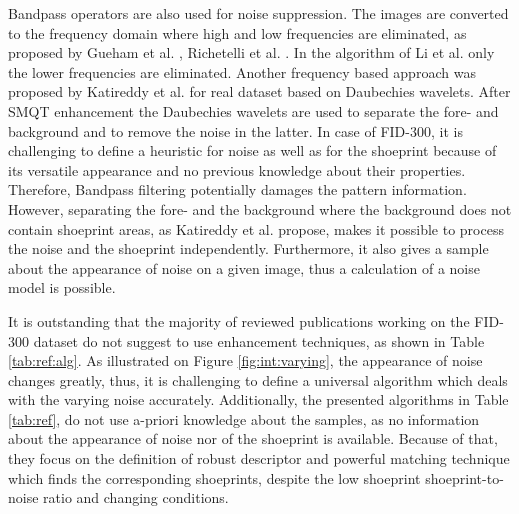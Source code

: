 \documentclass[draft,final]{vutinfth} %
\begin{document}
\par
Bandpass operators are also used for noise suppression.
The images are converted to the frequency domain where high and low frequencies are eliminated, as proposed by Gueham et al. \cite{gueham2007automatic},  Richetelli et al. \cite{richetelli2017classification}.
In the algorithm of Li et al. \cite{li2014retrieval} only the lower frequencies are eliminated.
Another frequency based approach was proposed by Katireddy et al. \cite{katireddy2017novel} for real dataset based on Daubechies wavelets.
After SMQT enhancement the Daubechies wavelets are used to separate the fore- and background and to remove the noise in the latter.
In case of FID-300, it is challenging to define a heuristic for noise as well as for the shoeprint because of its versatile appearance and no previous knowledge about their properties.
Therefore, Bandpass filtering potentially damages the pattern information.
However, separating the fore- and the background where the background does not contain shoeprint areas, as Katireddy et al. \cite{katireddy2017novel} propose, makes it possible to process the noise and the shoeprint independently.
Furthermore, it also gives a sample about the appearance of noise on a given image, thus a calculation of a noise model is possible.

\par
It is outstanding that the majority of reviewed publications working on the FID-300 dataset do not suggest to use enhancement techniques, as shown in Table \ref{tab:ref:alg}.
As illustrated on Figure \ref{fig:int:varying}, the appearance of noise changes greatly, thus, it is challenging to define a universal algorithm which deals with the  varying noise accurately.
Additionally, the presented algorithms in Table \ref{tab:ref}, do not use a-priori knowledge about the samples, as no information about the appearance of noise nor of the shoeprint is available.
Because of that, they focus on the definition of robust descriptor and powerful matching technique which finds the corresponding shoeprints, despite the low shoeprint shoeprint-to-noise ratio and changing conditions.
\end{document}
